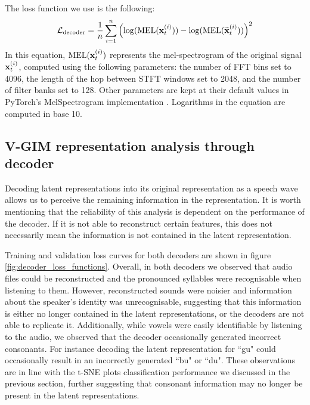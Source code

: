 		The loss function we use is the following:
		$$
		\mathcal{L}_{\text{decoder}} =\frac{1}{n} \sum_{i=1}^n\left( \log (\text{MEL} (\mathbf{x}_t^{(i)})) -\log (\text{MEL} (\widetilde{\mathbf{x}}_t^{(i)} )) \right)^2
		$$
		In this equation, $\text{MEL} (\mathbf{x}_t^{(i)})$ represents the mel-spectrogram of the original signal $\mathbf{x}_t^{(i)}$, computed using the following parameters: the number of FFT bins set to 4096, the length of the hop between STFT windows set to 2048, and the number of filter banks set to 128. Other parameters are kept at their default values in PyTorch's MelSpectrogram implementation \cite{paszkeAutomaticDifferentiationPyTorch2017}. Logarithms in the equation are computed in base 10.
		
		
		
		

			
	\subsection{V-GIM representation analysis through decoder}
		Decoding latent representations into its original representation as a speech wave allows us to perceive the remaining information in the representation. It is worth mentioning that the reliability of this analysis is dependent on the performance of the decoder. If it is not able to reconstruct certain features, this does not necessarily mean the information is not contained in the latent representation. 
		
		Training and validation loss curves for both decoders are shown in figure \ref{fig:decoder_loss_functions}. Overall, in both decoders we observed that audio files could be reconstructed and the pronounced syllables were recognisable when listening to them. However, reconstructed sounds were noisier and information about the speaker's identity was unrecognisable, suggesting that this information is either no longer contained in the latent representations, or the decoders are not able to replicate it. Additionally, while vowels were easily identifiable by listening to the audio, we observed that the decoder occasionally generated incorrect consonants. For instance decoding the latent representation for ``gu" could occasionally result in an incorrectly generated ``bu" or ``du". These observations are in line with the t-SNE plots classification performance we discussed in the previous section, further suggesting that consonant information may no longer be present in the latent representations.
		
